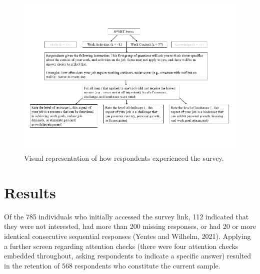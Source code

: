 \documentclass[
  man]{apa7}
\begin{document}
\begin{figure}
\centering
\includegraphics{Submission_files/figure-latex/onetviz-1.pdf}
\caption{\label{fig:onetviz}Visual representation of how respondents experienced the survey.}
\end{figure}

\section{Results}\label{results}

Of the 785 individuals who initially accessed the survey link, 112 indicated that they were not interested, had more than 200 missing responses, or had 20 or more identical consecutive sequential responses (Yentes and Wilhelm, 2021). Applying a further screen regarding attention checks (there were four attention checks embedded throughout, asking respondents to indicate a specific answer) resulted in the retention of 568 respondents who constitute the current sample.
\end{document}
